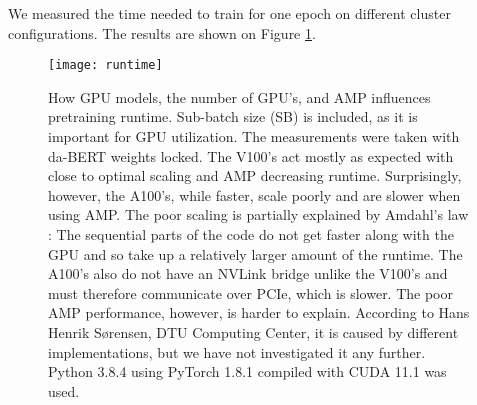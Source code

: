 \documentclass[main.tex]{subfiles}
\begin{document}
We measured the time needed to train for one epoch on different cluster configurations.
The results are shown on Figure \ref{fig:runtime}.
\begin{figure}
    \centering
    \texttt{[image: runtime]}
    \caption{
        How GPU models, the number of GPU's, and AMP influences pretraining runtime.
        Sub-batch size (SB) is included, as it is important for GPU utilization.
        The measurements were taken with da-BERT weights locked.
        The V100's act mostly as expected with close to optimal scaling and AMP decreasing runtime.
        Surprisingly, however, the A100's, while faster, scale poorly and are slower when using AMP.
        The poor scaling is partially explained by Amdahl's law \cite{klein2011amdahl}: The sequential parts of the code do not get faster along with the GPU and so take up a relatively larger amount of the runtime.
        The A100's also do not have an NVLink bridge unlike the V100's and must therefore communicate over PCIe, which is slower.
        The poor AMP performance, however, is harder to explain.
        According to Hans Henrik Sørensen, DTU Computing Center, it is caused by different  implementations, but we have not investigated it any further.
        Python 3.8.4 using PyTorch 1.8.1 compiled with CUDA 11.1 was used.
    }
    \label{fig:runtime}
\end{figure}\noindent
\end{document}
